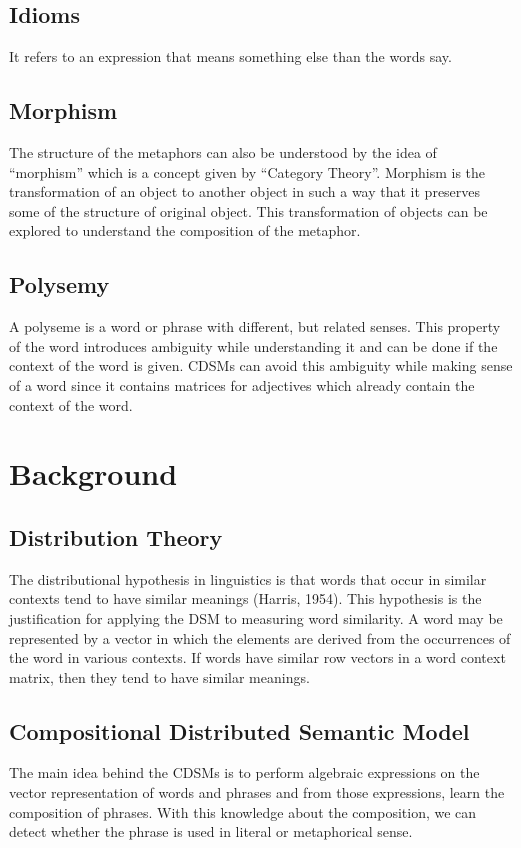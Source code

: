 \documentclass[a4paper]{article}
\begin{document}
\subsection{Idioms}
It refers to an expression that means something else than the words say.

\subsection{Morphism}
The structure of the metaphors can also be understood by the idea of “morphism” which is a concept given by “Category Theory”. Morphism is the transformation of an object to another object in such a way that it preserves some of the structure of original object. This transformation of objects can be explored to understand the composition of the metaphor.

\subsection{Polysemy}
A polyseme is a word or phrase with different, but related senses. This property of the word introduces ambiguity while understanding it and can be done if the context of the word is given. CDSMs can avoid this ambiguity while making sense of a word since it contains matrices for adjectives which already contain the context of the word.

\section{Background}

\subsection{Distribution Theory}
The distributional hypothesis in linguistics is that words that occur in similar contexts tend to have similar meanings (Harris, 1954). This hypothesis is the justification for  applying the DSM to measuring word similarity. A word may be represented by a vector in which the elements are derived from the occurrences of the word in various contexts. If words have similar row vectors in a word context matrix, then they tend to have similar meanings.

\subsection{Compositional Distributed Semantic Model}
The main idea behind the CDSMs is to perform algebraic expressions on the vector representation of words and phrases and from those expressions, learn the composition of phrases. With this knowledge about the composition, we can detect whether the phrase is used in literal or metaphorical sense.
\end{document}
